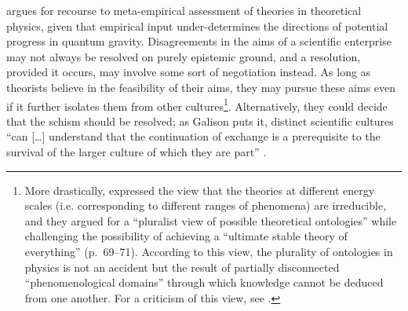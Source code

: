 \documentclass[smallextended]{svjour3}
\begin{document}
\citet{Dawid2013} argues for recourse to meta-empirical assessment of theories in theoretical physics, given that empirical input under-determines the directions of potential progress in quantum gravity. Disagreements in the aims of a scientific enterprise may not always be resolved on purely epistemic ground, and a resolution, provided it occurs, may involve some sort of negotiation instead.  As long as theorists believe in the feasibility of their aims, they may pursue these aims even if it further isolates them from other cultures\footnote{More drastically, \citet{Cao1993} expressed the view that the theories at different energy scales (i.e. corresponding to different ranges of phenomena) are irreducible, and they argued for a ``pluralist view of possible theoretical ontologies'' while challenging the possibility of achieving a ``ultimate stable theory  of everything'' (p.~69--71). According to this view, the plurality of ontologies in physics is not an accident but the result of partially disconnected ``phenomenological domains'' through which knowledge cannot be deduced from one another. For a criticism of this view, see \citealt{Rivat2020}.}. Alternatively, they could decide that the schism should be resolved; as Galison puts it, distinct scientific cultures ``can [\dots] understand that the continuation of exchange is a prerequisite to the survival of the larger culture of which they are part'' \citep[p.~803]{galison1997image}.%

\end{document}
